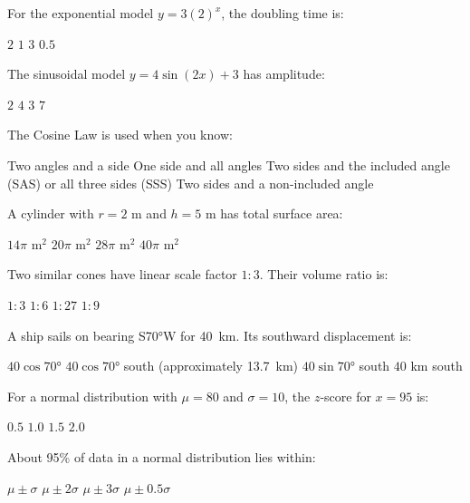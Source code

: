 \documentclass[addpoints]{exam}
\begin{document}
\begin{questions}
\question[1] For the exponential model $y = 3(2)^x$, the doubling time is:
\begin{choices}
    \choice $2$
    \correctchoice $1$
    \choice $3$
    \choice $0.5$
\end{choices}

\question[1] The sinusoidal model $y = 4\sin(2x) + 3$ has amplitude:
\begin{choices}
    \choice $2$
    \correctchoice $4$
    \choice $3$
    \choice $7$
\end{choices}

\question[1] The Cosine Law is used when you know:
\begin{choices}
    \choice Two angles and a side
    \choice One side and all angles
    \correctchoice Two sides and the included angle (SAS) or all three sides (SSS)
    \choice Two sides and a non-included angle
\end{choices}

\question[1] A cylinder with $r = 2$ m and $h = 5$ m has total surface area:
\begin{choices}
    \choice $14\pi$ m$^2$
    \choice $20\pi$ m$^2$
    \correctchoice $28\pi$ m$^2$
    \choice $40\pi$ m$^2$
\end{choices}

\question[1] Two similar cones have linear scale factor $1:3$. Their volume ratio is:
\begin{choices}
    \choice $1:3$
    \choice $1:6$
    \correctchoice $1:27$
    \choice $1:9$
\end{choices}

\question[1] A ship sails on bearing S\ang{70}W for \SI{40}{km}. Its southward displacement is:
\begin{choices}
    \choice $40\cos\ang{70}$
    \correctchoice $40\cos\ang{70}$ south (approximately \SI{13.7}{km})
    \choice $40\sin\ang{70}$ south
    \choice $40$ km south
\end{choices}

\question[1] For a normal distribution with $\mu = 80$ and $\sigma = 10$, the $z$-score for
$x = 95$ is:
\begin{choices}
    \choice $0.5$
    \choice $1.0$
    \correctchoice $1.5$
    \choice $2.0$
\end{choices}

\question[1] About 95\% of data in a normal distribution lies within:
\begin{choices}
    \choice $\mu \pm \sigma$
    \correctchoice $\mu \pm 2\sigma$
    \choice $\mu \pm 3\sigma$
    \choice $\mu \pm 0.5\sigma$
\end{choices}


\end{questions}
\end{document}
